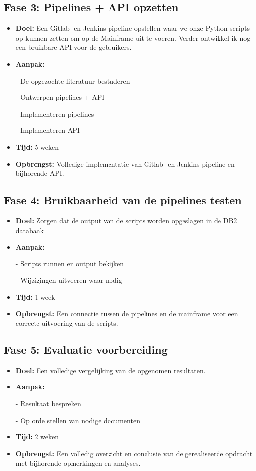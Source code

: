 \subsection{Fase 3: Pipelines + API opzetten}
\begin{itemize}
    \item \textbf{Doel:}
    Een Gitlab -en Jenkins pipeline opstellen waar we onze Python scripts op kunnen zetten om op de Mainframe uit te voeren. Verder ontwikkel ik nog een bruikbare API voor de gebruikers.
    \item \textbf{Aanpak:}
    \item[-] De opgezochte literatuur bestuderen
    \item[-] Ontwerpen pipelines + API
    \item[-] Implementeren pipelines
    \item[-] Implementeren API 
    
    \item \textbf{Tijd:} 5 weken
    \item \textbf{Opbrengst:}
    Volledige implementatie van Gitlab -en Jenkins pipeline en bijhorende API.
\end{itemize}


\subsection{Fase 4: Bruikbaarheid van de pipelines testen}
\begin{itemize}
    \item \textbf{Doel:}
    Zorgen dat de output van de scripts worden opgeslagen in de DB2 databank
    \item \textbf{Aanpak:}
    \item[-] Scripts runnen en output bekijken
    \item[-] Wijzigingen uitvoeren waar nodig
    
    \item \textbf{Tijd:} 1 week
    \item \textbf{Opbrengst:}
    Een connectie tussen de pipelines en de mainframe voor een correcte uitvoering van de scripts. 
\end{itemize}

\subsection{Fase 5: Evaluatie voorbereiding}
\begin{itemize}
    \item \textbf{Doel:}
    Een volledige vergelijking van de opgenomen resultaten.
    \item \textbf{Aanpak:}
    \item[-] Resultaat bespreken
    \item[-] Op orde stellen van nodige documenten
    \item \textbf{Tijd:} 2 weken
    \item \textbf{Opbrengst:}
    Een volledig overzicht en conclusie van de gerealiseerde opdracht met bijhorende opmerkingen en analyses. 
\end{itemize}



